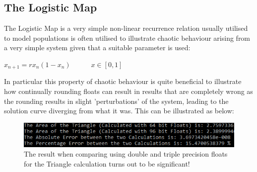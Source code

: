 \documentclass[twocolumn]{IEEEtran}
\begin{document}
\subsection{The Logistic Map}

The Logistic Map is a very simple non-linear recurrence relation usually utilised to model populations is often utilised to illustrate chaotic behaviour arising from a very simple system given that a suitable parameter is used:

\begin{theorem}
$x_{n+1} = r x_n (1 - x_n) \hspace{35pt} x \in [0,1]$
\end{theorem}



In particular this property of chaotic behaviour is quite beneficial to illustrate how continually rounding floats can result in results that are completely wrong as the rounding results in slight 'perturbations' of the system, leading to the solution curve diverging from what it was. This can be illustrated as below:

\begin{figure}[h]

\begin{center}

\includegraphics[scale=0.7]{Single_Triangle}
\caption{The result when comparing using double and triple precision floats for the Triangle calculation turns out to be significant!}

\end{center}

\end{figure}
\end{document}
